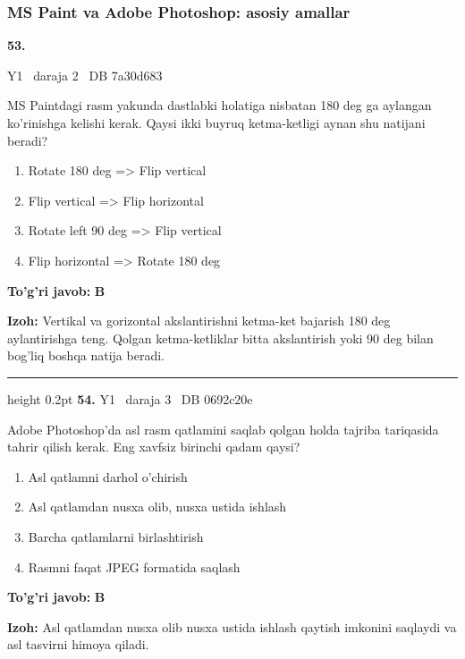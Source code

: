 \documentclass[10pt,a4paper,oneside]{article}
\begin{document}
\subsubsection{MS Paint va Adobe Photoshop: asosiy amallar}
\hypertarget{q53}{\textbf{\color{ink}53.}}  {\color{muted}\scriptsize Y1 \textbullet\ daraja 2 \textbullet\ DB 7a30d683}
\par
MS Paintdagi rasm yakunda dastlabki holatiga nisbatan 180 deg  ga aylangan ko'rinishga kelishi kerak. Qaysi ikki buyruq ketma-ketligi aynan shu natijani beradi?
\begin{enumerate}[label=\Alph*),leftmargin=9mm]
\item Rotate 180 deg  =\textgreater{} Flip vertical
\item Flip vertical =\textgreater{} Flip horizontal
\item Rotate left 90 deg  =\textgreater{} Flip vertical
\item Flip horizontal =\textgreater{} Rotate 180 deg 
\end{enumerate}
\begin{tcolorbox}[enhanced,breakable,colback=teal!4,colframe=teal!45!black,boxrule=0.45pt,arc=1.2mm,left=2.8mm,right=2.8mm,top=2mm,bottom=2mm,before skip=2mm,after skip=2mm]
\textbf{\color{teal}To'g'ri javob:} \textbf{B}
\par\smallskip
\textbf{Izoh:} Vertikal va gorizontal akslantirishni ketma-ket bajarish 180 deg  aylantirishga teng. Qolgan ketma-ketliklar bitta akslantirish yoki 90 deg  bilan bog'liq boshqa natija beradi.
\end{tcolorbox}
\vspace{2mm}\hrule height 0.2pt \vspace{4mm}
\hypertarget{q54}{\textbf{\color{ink}54.}}  {\color{muted}\scriptsize Y1 \textbullet\ daraja 3 \textbullet\ DB 0692c20e}
\par
Adobe Photoshop'da asl rasm qatlamini saqlab qolgan holda tajriba tariqasida tahrir qilish kerak. Eng xavfsiz birinchi qadam qaysi?
\begin{enumerate}[label=\Alph*),leftmargin=9mm]
\item Asl qatlamni darhol o'chirish
\item Asl qatlamdan nusxa olib, nusxa ustida ishlash
\item Barcha qatlamlarni birlashtirish
\item Rasmni faqat JPEG formatida saqlash
\end{enumerate}
\begin{tcolorbox}[enhanced,breakable,colback=teal!4,colframe=teal!45!black,boxrule=0.45pt,arc=1.2mm,left=2.8mm,right=2.8mm,top=2mm,bottom=2mm,before skip=2mm,after skip=2mm]
\textbf{\color{teal}To'g'ri javob:} \textbf{B}
\par\smallskip
\textbf{Izoh:} Asl qatlamdan nusxa olib nusxa ustida ishlash qaytish imkonini saqlaydi va asl tasvirni himoya qiladi.
\end{tcolorbox}
\end{document}
